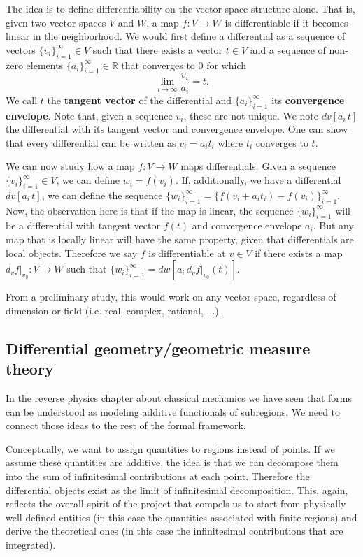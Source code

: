\documentclass[11pt,letterpaper,fleqn]{memoir} %
\begin{document}
The idea is to define differentiability on the vector space structure alone. That is, given two vector spaces $V$ and $W$, a map $f: V \to W$ is differentiable if it becomes linear in the neighborhood. We would first define a differential as a sequence of vectors $\{v_i\}_{i=1}^{\infty} \in V$ such that there exists a vector $t \in V$ and a sequence of non-zero elements $\{a_i\}_{i=1}^{\infty} \in \mathbb{R}$ that converges to $0$ for which
$$ \lim\limits_{i \to \infty} \frac{v_i}{a_i} = t.$$
We call $t$ the \textbf{tangent vector} of the differential and $\{a_i\}_{i=1}^{\infty}$ its \textbf{convergence envelope}. Note that, given a sequence $v_i$, these are not unique. We note $dv[a_i \, t]$ the differential with its tangent vector and convergence envelope. One can show that every differential can be written as $v_i = a_i t_i$ where $t_i$ converges to $t$.

We can now study how a map $f: V \to W$ maps differentials. Given a sequence  $\{v_i\}_{i=1}^{\infty} \in V$, we can define $w_i = f(v_i)$. If, additionally, we have a differential $dv[a_i \, t]$, we can define the sequence $\{w_i\}_{i=1}^{\infty} = \{f(v_i + a_i t_i) - f(v_i)\}_{i=1}^{\infty}$. Now, the observation here is that if the map is linear, the sequence $\{w_i\}_{i=1}^{\infty}$ will be a differential with tangent vector $f(t)$ and convergence envelope $a_i$. But any map that is locally linear will have the same property, given that differentials are local objects. Therefore we say $f$ is differentiable at $v \in V$ if there exists a map $d_v f |_{v_0} : V \to W$ such that $\{w_i\}_{i=1}^{\infty} = dw[a_i \, d_v f |_{v_0}(t)]$.

From a preliminary study, this would work on any vector space, regardless of dimension or field (i.e. real, complex, rational, ...).

\subsection{Differential geometry/geometric measure theory}

In the reverse physics chapter about classical mechanics we have seen that forms can be understood as modeling additive functionals of subregions. We need to connect those ideas to the rest of the formal framework.

Conceptually, we want to assign quantities to regions instead of points. If we assume these quantities are additive, the idea is that we can decompose them into the sum of infinitesimal contributions at each point. Therefore the differential objects exist as the limit of infinitesimal decomposition. This, again, reflects the overall spirit of the project that compels us to start from physically well defined entities (in this case the quantities associated with finite regions) and derive the theoretical ones (in this case the infinitesimal contributions that are integrated).
\end{document}
